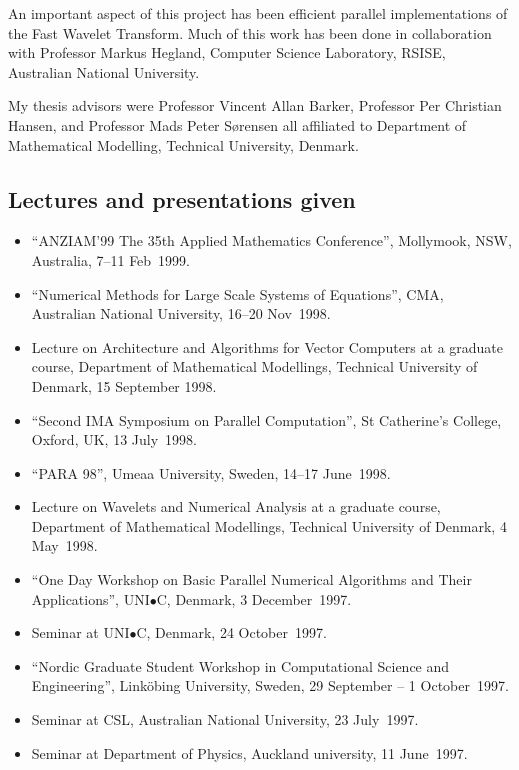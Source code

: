 \documentclass[12pt,a4paper]{article}
\begin{document}
An important aspect of this project has been efficient parallel
implementations of the Fast Wavelet Transform. Much of this work has been
done in collaboration with Professor Markus Hegland, Computer Science
Laboratory, RSISE, Australian National University.

My thesis advisors were Professor Vincent Allan Barker, Professor Per
Christian Hansen, and Professor Mads Peter S{\o}rensen all affiliated to
Department of Mathematical Modelling, Technical University, Denmark.

\subsection*{Lectures and presentations given}

\begin{itemize}
\item ``ANZIAM'99 The 35th Applied Mathematics Conference'', Mollymook, NSW, Australia, 7--11 Feb\ 1999.
\item ``Numerical Methods for Large Scale Systems of Equations'', CMA, Australian National University, 16--20 Nov\ 1998.
\item Lecture on Architecture and Algorithms for Vector Computers at a graduate course, Department of Mathematical Modellings, Technical University of Denmark, 15 September 1998. 
\item ``Second IMA Symposium on Parallel Computation'', St Catherine's College, Oxford, UK, 13 July\ 1998.
\item ``PARA 98'', Umeaa University, Sweden, 14--17 June\ 1998.
\item Lecture on Wavelets and Numerical Analysis at a graduate course,
Department of Mathematical Modellings, Technical University of Denmark, 4 May\ 1998.
\item ``One Day Workshop on Basic Parallel Numerical Algorithms and Their Applications'', UNI$\bullet $C, Denmark, 3 December\ 1997.
\item Seminar at UNI$\bullet$C, Denmark, 24 October\ 1997.  %
\item ``Nordic Graduate Student Workshop in Computational Science and Engineering'', Link{\"o}bing University, Sweden, 29 September -- 1 October\ 1997.
\item  Seminar at CSL, Australian National University, 23 July\ 1997.         %
\item  Seminar at Department of Physics, Auckland university, 11 June\ 1997.  %

\end{itemize}
\end{document}

